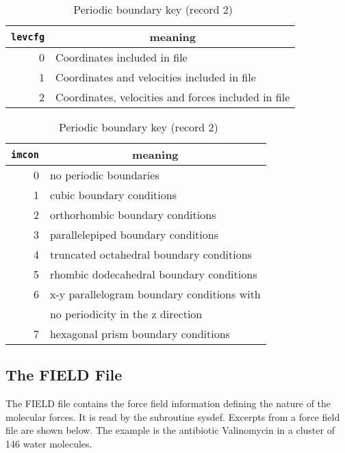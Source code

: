 \begin{table}[t]
 \caption{\label{LEVCFG}\ CONFIG file key (record 2)}
\vskip 10pt
 \begin{centering} \begin{tabular}{|r|l|}
\hline
{\tt levcfg} & \multicolumn{1}{c|}{meaning} \\
\hline
0 & Coordinates included in file\\
1 & Coordinates and velocities included in file\\
2 & Coordinates, velocities and forces included in file\\
\hline
\end{tabular}

\end{centering}

 \caption{\label{IMCON}\ Periodic boundary key (record 2)}
\vskip 10pt
\begin{centering} \begin{tabular}{|r|l|}
\hline
{\tt imcon} & \multicolumn{1}{c|}{meaning} \\
\hline
0 & no periodic boundaries\\
1 & cubic boundary conditions\index{boundary conditions!cubic}\\
2 & orthorhombic boundary conditions\\
3 & parallelepiped boundary conditions\\
4 & truncated octahedral\index{boundary conditions!truncated octahedron} boundary conditions\\
5 & rhombic dodecahedral\index{boundary conditions!rhombic dodecahedron} boundary conditions\\
6 & x-y parallelogram boundary conditions with\\
  & no periodicity in the z direction\\
7 & hexagonal prism\index{boundary conditions!hexagonal prism} boundary conditions \\
\hline
\end{tabular}

\end{centering}

\end{table}
\clearpage
\subsection{The FIELD File}
\label{fieldfile}

The FIELD file contains the force field information defining the
nature of the molecular forces. It is read by the subroutine {\sc
sysdef}. Excerpts from a force field file are shown below. The example
is the antibiotic Valinomycin in a cluster of 146 water molecules.

